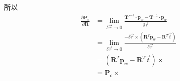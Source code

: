 \documentclass{article}
\begin{document}
\begin{itemize}
	      所以 
	      \begin{equation}
	      	\begin{aligned}
	      		\frac{\partial{\boldsymbol{P}_c}}{\partial{\boldsymbol{R}}} & = \lim_{\delta{\vec{r}}  \rightarrow0}\frac{\boldsymbol{T}'^{-1} \cdot \boldsymbol{p}_w -\boldsymbol{T}^{-1}  \cdot \boldsymbol{p}_w}{\delta{\vec{r}}} \\&= 
	      		\lim_{\delta{\vec{r}}  \rightarrow0} \frac{-\delta\vec{r}\times(\boldsymbol{R}^T\boldsymbol{p}_w-\boldsymbol{R}^T\vec{t})}{\delta{\vec{r}}} \\&=
	      		(\boldsymbol{R}^T\boldsymbol{p}_w-\boldsymbol{R}^T\vec{t})\times\\&=
	      		\boldsymbol{P}_c\times
	      	\end{aligned}
	      \end{equation} 
	      	      	      	      

\end{itemize}
\end{document}
